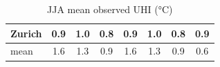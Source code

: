 \begin{table}[t]
\begin{tabular}{lccc ccc c}
Zurich & \cellcolor[RGB]{254,198,97}0.9 & \cellcolor[RGB]{254,187,86}1.0 & \cellcolor[RGB]{254,206,107}0.8 & \cellcolor[RGB]{254,198,97}0.9 & \cellcolor[RGB]{254,187,86}1.0 & \cellcolor[RGB]{254,206,107}0.8 & \cellcolor[RGB]{254,203,103}0.9 \\
\midrule
mean & \cellcolor[RGB]{252,124,55}1.6 & \cellcolor[RGB]{253,163,69}1.3 & \cellcolor[RGB]{254,203,103}0.9 & \cellcolor[RGB]{252,124,55}1.6 & \cellcolor[RGB]{253,163,69}1.3 & \cellcolor[RGB]{254,203,103}0.9 & \cellcolor[RGB]{254,227,140}0.6 \\
\bottomrule
\end{tabular}
\caption{JJA mean observed UHI (°C)}
\label{tab:obs}
\end{table}